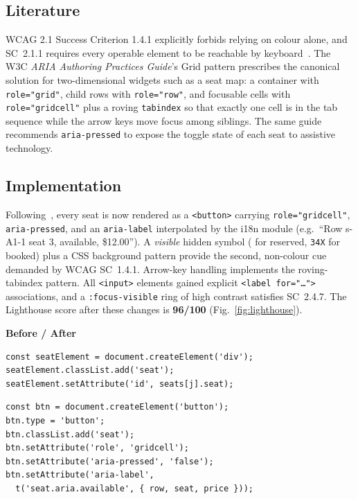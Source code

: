 \documentclass[a4paper,11pt]{article}
\begin{document}
\subsection{Literature}
WCAG 2.1 Success Criterion 1.4.1 explicitly forbids relying on colour
alone, and SC~2.1.1 requires every operable element to be reachable
by keyboard~\cite{wcag21}.  The W3C \textit{ARIA Authoring Practices
Guide}'s Grid pattern \cite{ariaapg} prescribes the canonical solution
for two-dimensional widgets such as a seat map: a container with
\texttt{role="grid"}, child rows with \texttt{role="row"}, and
focusable cells with \texttt{role="gridcell"} plus a roving
\texttt{tabindex} so that exactly one cell is in the tab sequence
while the arrow keys move focus among siblings.  The same guide
recommends \texttt{aria-pressed} to expose the toggle state of each
seat to assistive technology.

\subsection{Implementation}
Following~\cite{ariaapg}, every seat is now rendered as a
\texttt{<button>} carrying \texttt{role="gridcell"},
\texttt{aria-pressed}, and an \texttt{aria-label} interpolated by the
i18n module (e.g.\ ``Row s-A1-1 seat 3, available, \$12.00'').  A
\textit{visible} hidden symbol (\texttt{\textcheckmark{}} for
reserved, \texttt{\char34X} for booked) plus a CSS background
pattern provide the second, non-colour cue demanded by WCAG SC~1.4.1.
Arrow-key handling implements the roving-tabindex pattern.  All
\texttt{<input>} elements gained explicit \texttt{<label for="\ldots">}
associations, and a \texttt{:focus-visible} ring of high contrast
satisfies SC~2.4.7.  The Lighthouse score after these changes is
\textbf{96/100} (Fig.~\ref{fig:lighthouse}).

\noindent\textbf{Before / After}
\begin{lstlisting}[caption={Original seat element --- a non-semantic div.},captionpos=b]
const seatElement = document.createElement('div');
seatElement.classList.add('seat');
seatElement.setAttribute('id', seats[j].seat);
\end{lstlisting}
\begin{lstlisting}[caption={Refactored to a semantic, ARIA-rich button.},captionpos=b]
const btn = document.createElement('button');
btn.type = 'button';
btn.classList.add('seat');
btn.setAttribute('role', 'gridcell');
btn.setAttribute('aria-pressed', 'false');
btn.setAttribute('aria-label',
  t('seat.aria.available', { row, seat, price }));
\end{lstlisting}
\end{document}
